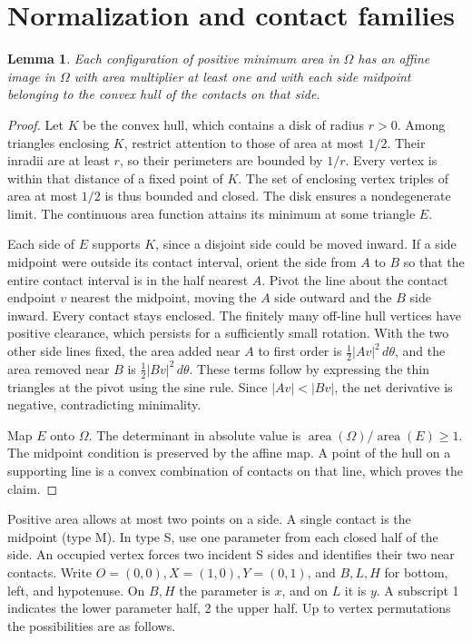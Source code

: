 \documentclass[11pt]{amsart}
\newtheorem{lemma}[theorem]{Lemma}
\newcommand{\Om}{\Omega}
\newcommand{\area}{\operatorname{area}}
\begin{document}
\section{Normalization and contact families}\label{sec:norm}
\begin{lemma}
Each configuration of positive minimum area in \(\Om\) has an affine image in \(\Om\) with area multiplier at least one and with each side midpoint belonging to the convex hull of the contacts on that side.
\end{lemma}
\begin{proof}
Let \(K\) be the convex hull, which contains a disk of radius \(r>0\). Among triangles enclosing \(K\), restrict attention to those of area at most \(1/2\). Their inradii are at least \(r\), so their perimeters are bounded by \(1/r\). Every vertex is within that distance of a fixed point of \(K\). The set of enclosing vertex triples of area at most \(1/2\) is thus bounded and closed. The disk ensures a nondegenerate limit. The continuous area function attains its minimum at some triangle \(E\).

Each side of \(E\) supports \(K\), since a disjoint side could be moved inward. If a side midpoint were outside its contact interval, orient the side from \(A\) to \(B\) so that the entire contact interval is in the half nearest \(A\). Pivot the line about the contact endpoint \(v\) nearest the midpoint, moving the \(A\) side outward and the \(B\) side inward. Every contact stays enclosed. The finitely many off-line hull vertices have positive clearance, which persists for a sufficiently small rotation. With the two other side lines fixed, the area added near \(A\) to first order is \(\tfrac12|Av|^2\,d\theta\), and the area removed near \(B\) is \(\tfrac12|Bv|^2\,d\theta\). These terms follow by expressing the thin triangles at the pivot using the sine rule. Since \(|Av|<|Bv|\), the net derivative is negative, contradicting minimality.

Map \(E\) onto \(\Om\). The determinant in absolute value is \(\area(\Om)/\area(E)\ge1\). The midpoint condition is preserved by the affine map. A point of the hull on a supporting line is a convex combination of contacts on that line, which proves the claim.
\end{proof}

Positive area allows at most two points on a side. A single contact is the midpoint (type M). In type S, use one parameter from each closed half of the side. An occupied vertex forces two incident S sides and identifies their two near contacts. Write \(O=(0,0),X=(1,0),Y=(0,1)\), and \(B,L,H\) for bottom, left, and hypotenuse. On \(B,H\) the parameter is \(x\), and on \(L\) it is \(y\). A subscript 1 indicates the lower parameter half, 2 the upper half. Up to vertex permutations the possibilities are as follows.
\end{document}
